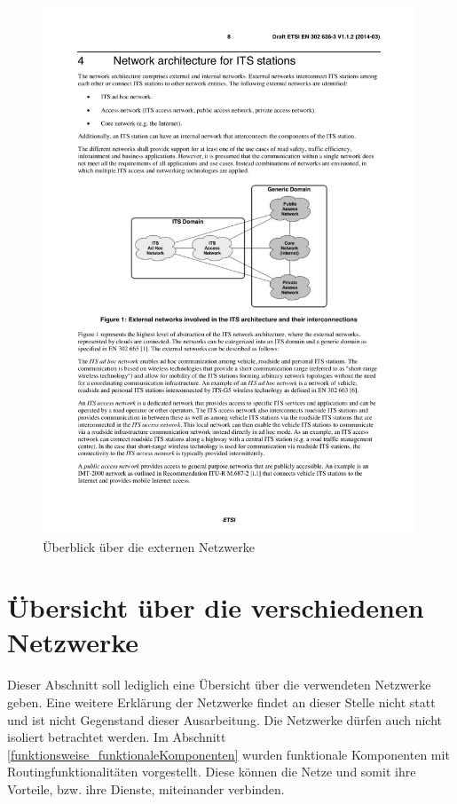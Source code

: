 \begin{figure}[h]
	\includegraphics[width=0.99\textwidth]{content/images/02_architektur/uebersichtExterneNetzwerke.pdf}
	\caption{Überblick über die externen Netzwerke \cite{etsi302636-3}}
	\label{fig:architektur_ueberblickNetzwerke}
\end{figure}

\section{Übersicht über die verschiedenen Netzwerke \label{architektur_ueberblickNetzwerke}}
Dieser Abschnitt soll lediglich eine Übersicht über die verwendeten Netzwerke geben. Eine weitere Erklärung der Netzwerke findet an dieser Stelle nicht statt und ist nicht Gegenstand dieser Ausarbeitung. Die Netzwerke dürfen auch nicht isoliert betrachtet werden. Im Abschnitt \ref{funktionsweise_funktionaleKomponenten} wurden funktionale Komponenten mit Routingfunktionalitäten vorgestellt. Diese können die Netze und somit ihre Vorteile, bzw. ihre Dienste, miteinander verbinden.

